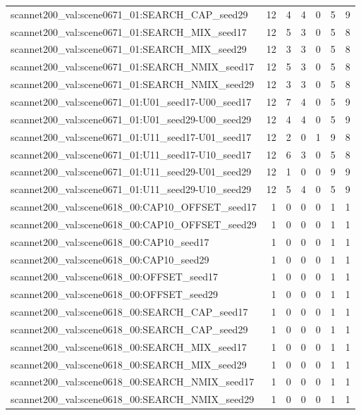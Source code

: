 \begin{table}[t]
\begin{tabular}{lrrrrrr}
scannet200\_val:scene0671\_01:SEARCH\_CAP\_seed29 & 12 & 4 & 4 & 0 & 5 & 9 \\
scannet200\_val:scene0671\_01:SEARCH\_MIX\_seed17 & 12 & 5 & 3 & 0 & 5 & 8 \\
scannet200\_val:scene0671\_01:SEARCH\_MIX\_seed29 & 12 & 3 & 3 & 0 & 5 & 8 \\
scannet200\_val:scene0671\_01:SEARCH\_NMIX\_seed17 & 12 & 5 & 3 & 0 & 5 & 8 \\
scannet200\_val:scene0671\_01:SEARCH\_NMIX\_seed29 & 12 & 3 & 3 & 0 & 5 & 8 \\
scannet200\_val:scene0671\_01:U01\_seed17-U00\_seed17 & 12 & 7 & 4 & 0 & 5 & 9 \\
scannet200\_val:scene0671\_01:U01\_seed29-U00\_seed29 & 12 & 4 & 4 & 0 & 5 & 9 \\
scannet200\_val:scene0671\_01:U11\_seed17-U01\_seed17 & 12 & 2 & 0 & 1 & 9 & 8 \\
scannet200\_val:scene0671\_01:U11\_seed17-U10\_seed17 & 12 & 6 & 3 & 0 & 5 & 8 \\
scannet200\_val:scene0671\_01:U11\_seed29-U01\_seed29 & 12 & 1 & 0 & 0 & 9 & 9 \\
scannet200\_val:scene0671\_01:U11\_seed29-U10\_seed29 & 12 & 5 & 4 & 0 & 5 & 9 \\
scannet200\_val:scene0618\_00:CAP10\_OFFSET\_seed17 & 1 & 0 & 0 & 0 & 1 & 1 \\
scannet200\_val:scene0618\_00:CAP10\_OFFSET\_seed29 & 1 & 0 & 0 & 0 & 1 & 1 \\
scannet200\_val:scene0618\_00:CAP10\_seed17 & 1 & 0 & 0 & 0 & 1 & 1 \\
scannet200\_val:scene0618\_00:CAP10\_seed29 & 1 & 0 & 0 & 0 & 1 & 1 \\
scannet200\_val:scene0618\_00:OFFSET\_seed17 & 1 & 0 & 0 & 0 & 1 & 1 \\
scannet200\_val:scene0618\_00:OFFSET\_seed29 & 1 & 0 & 0 & 0 & 1 & 1 \\
scannet200\_val:scene0618\_00:SEARCH\_CAP\_seed17 & 1 & 0 & 0 & 0 & 1 & 1 \\
scannet200\_val:scene0618\_00:SEARCH\_CAP\_seed29 & 1 & 0 & 0 & 0 & 1 & 1 \\
scannet200\_val:scene0618\_00:SEARCH\_MIX\_seed17 & 1 & 0 & 0 & 0 & 1 & 1 \\
scannet200\_val:scene0618\_00:SEARCH\_MIX\_seed29 & 1 & 0 & 0 & 0 & 1 & 1 \\
scannet200\_val:scene0618\_00:SEARCH\_NMIX\_seed17 & 1 & 0 & 0 & 0 & 1 & 1 \\
scannet200\_val:scene0618\_00:SEARCH\_NMIX\_seed29 & 1 & 0 & 0 & 0 & 1 & 1 \\

\end{tabular}
\end{table}
